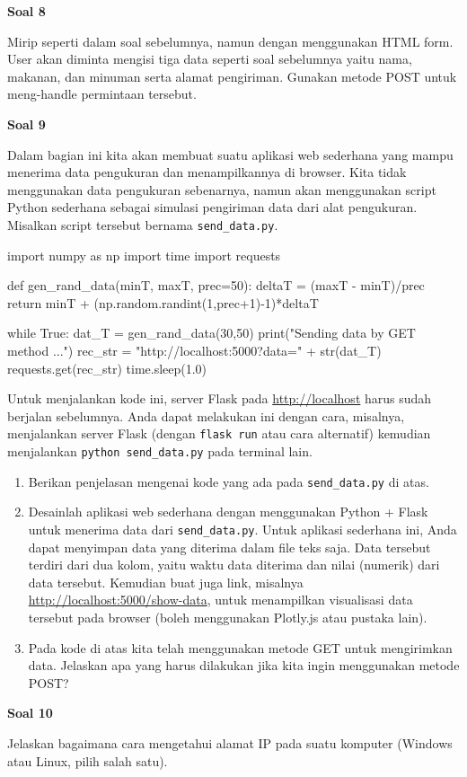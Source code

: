 \documentclass[a4paper,10pt]{extarticle}
\begin{document}
\textbf{Soal 8}

Mirip seperti dalam soal sebelumnya, namun dengan menggunakan HTML form.
User akan diminta mengisi tiga data seperti soal sebelumnya
yaitu nama, makanan, dan minuman serta alamat pengiriman.
Gunakan metode POST untuk meng-handle permintaan tersebut.

\textbf{Soal 9}

Dalam bagian ini kita akan membuat suatu aplikasi web sederhana
yang mampu menerima data pengukuran dan menampilkannya di browser.
Kita tidak menggunakan data pengukuran sebenarnya, namun akan menggunakan
script Python sederhana sebagai simulasi pengiriman data dari alat pengukuran.
Misalkan script tersebut bernama \verb|send_data.py|.
\begin{pythoncode}
import numpy as np
import time
import requests

def gen_rand_data(minT, maxT, prec=50):
    deltaT = (maxT - minT)/prec
    return minT + (np.random.randint(1,prec+1)-1)*deltaT

while True:
    dat_T = gen_rand_data(30,50)
    print("Sending data by GET method ...")
    rec_str = "http://localhost:5000?data=" + str(dat_T)
    requests.get(rec_str)
    time.sleep(1.0)
\end{pythoncode}

Untuk menjalankan kode ini, server Flask pada \url{http://localhost}
harus sudah berjalan sebelumnya. Anda dapat melakukan ini dengan cara,
misalnya, menjalankan server Flask (dengan \texttt{flask run} atau cara
alternatif) kemudian menjalankan \texttt{python send\_data.py} pada
terminal lain.

\begin{enumerate}
\item Berikan penjelasan mengenai kode yang ada pada \verb|send_data.py| di atas.
\item Desainlah aplikasi web sederhana dengan menggunakan Python + Flask untuk
menerima data dari \verb|send_data.py|. Untuk aplikasi sederhana ini, Anda dapat
menyimpan data yang diterima dalam file teks saja. 
Data tersebut terdiri dari dua kolom, yaitu waktu data diterima dan nilai (numerik)
dari data tersebut.
Kemudian buat juga link, misalnya \url{http://localhost:5000/show-data},
untuk menampilkan visualisasi data tersebut pada browser
(boleh menggunakan \textsf{Plotly.js} atau pustaka lain).
\item Pada kode di atas kita telah menggunakan metode GET untuk mengirimkan data.
Jelaskan apa yang harus dilakukan jika kita ingin menggunakan metode POST?
\end{enumerate}

\textbf{Soal 10}

Jelaskan bagaimana cara mengetahui alamat IP pada suatu komputer (Windows atau
Linux, pilih salah satu).
\end{document}
